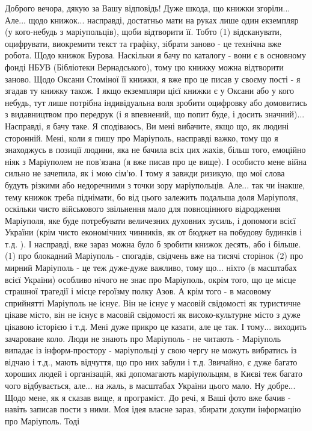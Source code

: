  
 
 
 
 


Доброго вечора, дякую за Вашу відповідь! Дуже шкода, що книжки згоріли...
Але... щодо книжок... насправді, достатньо мати на руках лише один екземпляр (у
кого-небудь з маріупольців), щоби відтворити її. Тобто (1) відсканувати,
оцифрувати, виокремити текст та графіку, зібрати заново - це технічна вже
робота.  Щодо книжок Бурова. Наскільки я бачу по каталогу - вони є в основному
фонді НБУВ (Бібліотеки Вернадського), тому цю книжку можна відтворити заново.
Щодо Оксани Стоміної її книжки, я вже про це писав у своєму пості - я згадав ту
книжку також. І якщо екземпляри цієї книжки є у Оксани або у кого небудь, тут
лише потрібна індивідуальна воля зробити оцифровку або домовитись з
видавництвом про передрук (і я впевнений, що попит буде, і досить значний)...
Насправді, я бачу таке. Я сподіваюсь, Ви мені вибачите, якщо що, як людині
сторонній. Мені, коли я пишу про Маріуполь, насправді важко, тому що я
знаходжусь в позиції людини, яка не бачила всіх цих жахів, більш того, емоційно
ніяк з Маріуполем не пов'язана (я вже писав про це вище). І особисто мене війна
сильно не зачепила, як і мою сім'ю. І тому я завжди ризикую, що мої слова
будуть різкими або недоречними з точки зору маріупольців. Але... так чи інакше,
тему книжок треба піднімати, бо від цього залежить подальша доля Маріуполя,
оскільки чисто військового звільнення мало для повноцінного відродження
Маріуполя, яке буде потребувати величезних духовних зусиль, і допомоги всієї
України (крім чисто економічних чинників, як от бюджет на побудову будинків і
т.д. ). І насправді, вже зараз можна було б зробити книжок десять, або і
більше. (1) про блокадний Маріуполь - спогадів, свідчень вже на тисячі сторінок
(2) про мирний Маріуполь - це теж дуже-дуже важливо, тому що... ніхто (в
масштабах всієї України) особливо нічого не знає про Маріуполь, окрім того, що
це місце страшної трагедії і місце героїзму полку Азов. А крім того - в
масовому сприйнятті Маріуполь не існує. Він не існує у масовій свідомості як
туристичне цікаве місто, він не існує в масовій свідомості як високо-культурне
місто з дуже цікавою історією і т.д. Мені дуже прикро це казати, але це так. І
тому... виходить зачароване коло. Люди не знають про Маріуполь - не читають -
Маріуполь випадає із інформ-простору - маріупольці у свою чергу не можуть
вибратись із відчаю і т.д., мають відчуття, що про них забули і т.д. Звичайно,
є дуже багато хороших людей і організацій, які допомагають маріупольцям, в
Києві теж багато чого відбувається, але... на жаль, в масштабах України цього
мало. Ну добре... Щодо мене, як я сказав вище, я програміст. До речі, я Ваші
фото вже бачив - навіть записав пости з ними. Моя ідея власне зараз, збирати
докупи інформацію про Маріуполь. Тоді 
